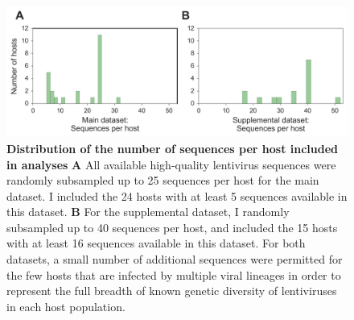 \begin{figure}[h!]
  \begin{centering}
    \includegraphics[width=.8\linewidth]{./png/siv_dataset_distrib.png}
  	\caption[Distribution of the number of sequences per host included in analyses]{\textbf{Distribution of the number of sequences per host included in analyses }
\textbf{A} All available high-quality lentivirus sequences were randomly subsampled up to 25 sequences per host for the main dataset.
I included the 24 hosts with at least 5 sequences available in this dataset.
\textbf{B} For the supplemental dataset, I randomly subsampled up to 40 sequences per host, and included the 15 hosts with at least 16 sequences available in this dataset.
For both datasets, a small number of additional sequences were permitted for the few hosts that are infected by multiple viral lineages in order to represent the full breadth of known genetic diversity of lentiviruses in each host population.
        }
  	\label{siv_dataset_distrib}
  \end{centering}
\end{figure}

